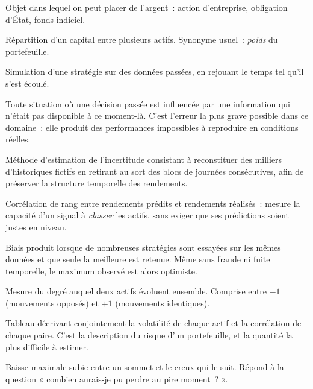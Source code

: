 \begin{description}\setlength{\itemsep}{0.35em}

\item[Actif] Objet dans lequel on peut placer de l'argent~: action d'entreprise,
obligation d'État, fonds indiciel.

\item[Allocation] Répartition d'un capital entre plusieurs actifs. Synonyme
usuel~: \emph{poids} du portefeuille.

\item[Backtest] Simulation d'une stratégie sur des données passées, en rejouant
le temps tel qu'il s'est écoulé.

\item[Biais de survivance / de vision du futur] Toute situation où une décision
passée est influencée par une information qui n'était pas disponible à ce
moment-là. C'est l'erreur la plus grave possible dans ce domaine~: elle produit
des performances impossibles à reproduire en conditions réelles.

\item[Bootstrap à blocs] Méthode d'estimation de l'incertitude consistant à
reconstituer des milliers d'historiques fictifs en retirant au sort des blocs de
journées consécutives, afin de préserver la structure temporelle des rendements.

\item[Coefficient d'information] Corrélation de rang entre rendements prédits et
rendements réalisés~: mesure la capacité d'un signal à \emph{classer} les actifs,
sans exiger que ses prédictions soient justes en niveau.

\item[Data snooping] Biais produit lorsque de nombreuses stratégies sont
essayées sur les mêmes données et que seule la meilleure est retenue. Même sans
fraude ni fuite temporelle, le maximum observé est alors optimiste.

\item[Corrélation] Mesure du degré auquel deux actifs évoluent ensemble. Comprise
entre $-1$ (mouvements opposés) et $+1$ (mouvements identiques).

\item[Covariance (matrice de)] Tableau décrivant conjointement la volatilité de
chaque actif et la corrélation de chaque paire. C'est la description du risque
d'un portefeuille, et la quantité la plus difficile à estimer.

\item[\emph{Drawdown} (perte maximale)] Baisse maximale subie entre un sommet et
le creux qui le suit. Répond à la question « combien aurais-je pu perdre au pire
moment~? ».


\end{description}
